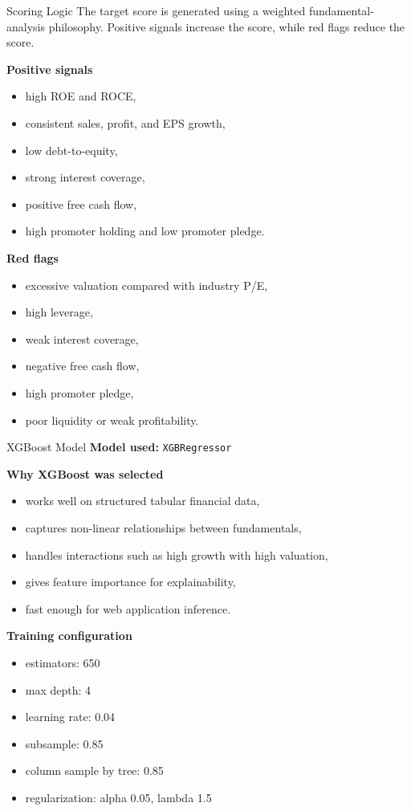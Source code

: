 \documentclass[aspectratio=169]{beamer}
\begin{document}
\begin{frame}[shrink=8]{Scoring Logic}
\small
\justifying
The target score is generated using a weighted fundamental-analysis philosophy. Positive signals increase the score, while red flags reduce the score.

\vspace{0.2cm}
\textbf{Positive signals}
\begin{itemize}
  \item high ROE and ROCE,
  \item consistent sales, profit, and EPS growth,
  \item low debt-to-equity,
  \item strong interest coverage,
  \item positive free cash flow,
  \item high promoter holding and low promoter pledge.
\end{itemize}

\textbf{Red flags}
\begin{itemize}
  \item excessive valuation compared with industry P/E,
  \item high leverage,
  \item weak interest coverage,
  \item negative free cash flow,
  \item high promoter pledge,
  \item poor liquidity or weak profitability.
\end{itemize}
\end{frame}

\begin{frame}[shrink=8]{XGBoost Model}
\small
\textbf{Model used:} \texttt{XGBRegressor}

\vspace{0.2cm}
\textbf{Why XGBoost was selected}
\begin{itemize}
  \item works well on structured tabular financial data,
  \item captures non-linear relationships between fundamentals,
  \item handles interactions such as high growth with high valuation,
  \item gives feature importance for explainability,
  \item fast enough for web application inference.
\end{itemize}

\vspace{0.2cm}
\textbf{Training configuration}
\begin{itemize}
  \item estimators: 650
  \item max depth: 4
  \item learning rate: 0.04
  \item subsample: 0.85
  \item column sample by tree: 0.85
  \item regularization: alpha 0.05, lambda 1.5
\end{itemize}
\end{frame}
\end{document}
